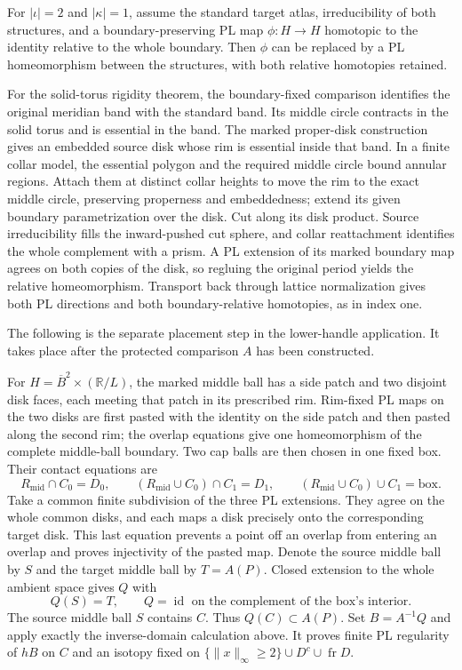 \begin{theorem}
\label{thm:rigidity-index-two}
For $|\iota|=2$ and $|\kappa|=1$, assume the standard target atlas,
irreducibility of both structures, and a boundary-preserving PL map
$\phi:H\to H$ homotopic to the identity relative to the whole boundary.
Then $\phi$ can be replaced by a PL homeomorphism between the structures,
with both relative homotopies retained.
\end{theorem}

For the solid-torus rigidity theorem, the boundary-fixed comparison
identifies the original meridian band with the standard band. Its middle
circle contracts in the solid torus and is essential in the band.
The marked proper-disk construction gives an embedded source disk
whose rim is essential inside that band. In a finite collar model, the
essential polygon and the required middle circle bound annular regions.
Attach them at distinct collar heights to move the rim to the exact
middle circle, preserving properness and embeddedness; extend its given
boundary parametrization over the disk. Cut along its disk product.
Source irreducibility fills the inward-pushed cut sphere, and collar
reattachment identifies the whole complement with a prism. A PL
extension of its marked boundary map agrees on both copies of the disk,
so regluing the original period yields the relative homeomorphism.
Transport back through lattice normalization gives both PL directions
and both boundary-relative homotopies, as in index one.

The following is the separate placement step in the lower-handle
application. It takes place after the protected comparison $A$ has
been constructed.

For $H=\overline B^2\times(\mathbb R/L)$, the marked middle ball has a side
patch and two disjoint disk faces, each meeting that patch in its prescribed
rim. Rim-fixed PL maps on the two disks
are first pasted with the identity on the side patch and then pasted along the
second rim; the overlap equations give one homeomorphism of the complete
middle-ball boundary.  Two cap balls are then chosen in one fixed box.  Their
contact equations are
\[
 R_{\mathrm{mid}}\cap C_0=D_0,\qquad
 (R_{\mathrm{mid}}\cup C_0)\cap C_1=D_1,\qquad
 (R_{\mathrm{mid}}\cup C_0)\cup C_1=\text{box}.
\]
Take a common finite subdivision of the three PL extensions. They
agree on the whole common disks, and each maps a disk precisely onto
the corresponding target disk. This last equation prevents a point off
an overlap from entering an overlap and proves injectivity of the pasted
map. Denote the source middle ball by $S$ and the target middle ball by
$T=A(P)$. Closed extension to the whole ambient space gives $Q$ with
\[
 Q(S)=T,\qquad Q=\operatorname{id}\text{ on the complement of the box's
 interior}.
\]
The source middle ball $S$ contains $C$. Thus $Q(C)\subset A(P)$.
Set $B=A^{-1}Q$ and apply exactly the inverse-domain calculation above.
It proves finite PL regularity of $hB$ on $C$ and an isotopy fixed on
$\{\|x\|_\infty\geq2\}\cup D^c\cup\operatorname{fr}D$.

